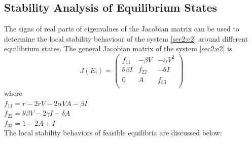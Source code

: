 \documentclass[12pt]{article}
\numberwithin{equation}{section}
\begin{document}
\subsection{Stability Analysis of Equilibrium States}
 The signs of real parts of eigenvalues of the Jacobian matrix can be used to determine the local stability behaviour of the system \eqref{sec2:e2} around different equilibrium states.
The general Jacobian matrix of the system \eqref{sec2:e2} is
\begin{equation}\label{sec3:e28}
J(E_i)=
\left({\begin{matrix}
	f_{11} & -\beta V & -\alpha V^2\\
	\theta \beta I & f_{22} & -\theta I\\
	0 & A & f_{33}\\
\end{matrix}}\right)
\end{equation}
where\\
$f_{11}=r-2rV-2\alpha V A-\beta I$\\
$f_{22}=\theta \beta V - 2\gamma I - \delta A$\\
$f_{33}=1-2A + I$\\
The local stability behaviors of  feasible equilibria are discussed below:
\end{document}
